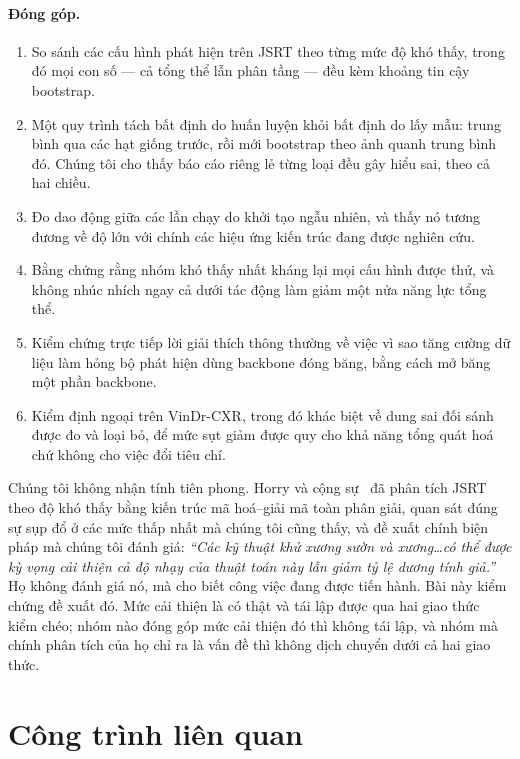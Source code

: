 \documentclass[12pt,a4paper]{article}
\begin{document}
\paragraph{Đóng góp.}
\begin{enumerate}
  \item So sánh các cấu hình phát hiện trên JSRT theo từng mức độ khó thấy,
        trong đó mọi con số --- cả tổng thể lẫn phân tầng --- đều kèm khoảng
        tin cậy bootstrap.
  \item Một quy trình tách bất định do huấn luyện khỏi bất định do lấy mẫu:
        trung bình qua các hạt giống trước, rồi mới bootstrap theo ảnh quanh
        trung bình đó. Chúng tôi cho thấy báo cáo riêng lẻ từng loại đều gây
        hiểu sai, theo cả hai chiều.
  \item Đo dao động giữa các lần chạy do khởi tạo ngẫu nhiên, và thấy nó tương
        đương về độ lớn với chính các hiệu ứng kiến trúc đang được nghiên cứu.
  \item Bằng chứng rằng nhóm khó thấy nhất kháng lại mọi cấu hình được thử, và
        không nhúc nhích ngay cả dưới tác động làm giảm một nửa năng lực tổng thể.
  \item Kiểm chứng trực tiếp lời giải thích thông thường về việc vì sao tăng
        cường dữ liệu làm hỏng bộ phát hiện dùng backbone đóng băng, bằng cách
        mở băng một phần backbone.
  \item Kiểm định ngoại trên VinDr-CXR, trong đó khác biệt về dung sai đối sánh
        được đo và loại bỏ, để mức sụt giảm được quy cho khả năng tổng quát hoá
        chứ không cho việc đổi tiêu chí.
\end{enumerate}

Chúng tôi không nhận tính tiên phong. Horry và cộng sự~\cite{horry2023fullres}
đã phân tích JSRT theo độ khó thấy bằng kiến trúc mã hoá--giải mã toàn phân giải,
quan sát đúng sự sụp đổ ở các mức thấp nhất mà chúng tôi cũng thấy, và đề xuất
chính biện pháp mà chúng tôi đánh giá: \emph{``Các kỹ thuật khử xương sườn và
xương\ldots có thể được kỳ vọng cải thiện cả độ nhạy của thuật toán này lẫn giảm
tỷ lệ dương tính giả.''} Họ không đánh giá nó, mà cho biết công việc đang được
tiến hành. Bài này kiểm chứng đề xuất đó. Mức cải thiện là có thật và tái lập
được qua hai giao thức kiểm chéo; nhóm nào đóng góp mức cải thiện đó thì không
tái lập, và nhóm mà chính phân tích của họ chỉ ra là vấn đề thì không dịch
chuyển dưới cả hai giao thức.

\section{Công trình liên quan}
\end{document}
